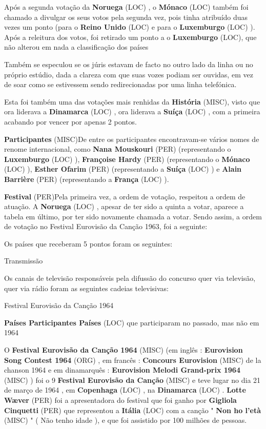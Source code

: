 \documentclass[12pt,a4paper]{article}
\begin{document}
Após a segunda votação da \textbf{Noruega} (LOC) , o \textbf{Mónaco} (LOC) também foi chamado a divulgar os seus votos pela segunda vez, pois tinha atribuído duas vezes um ponto (para o \textbf{Reino Unido} (LOC) e para o \textbf{Luxemburgo} (LOC) ). Após a releitura dos votos, foi retirado um ponto a o \textbf{Luxemburgo} (LOC), que não alterou em nada a classificação dos países

Também se especulou se os júris estavam de facto no outro lado da linha ou no próprio estúdio, dada a clareza com que suas vozes podiam ser ouvidas, em vez de soar como se estivessem sendo redirecionadas por uma linha telefónica.

Esta foi também uma das votações mais renhidas da \textbf{História} (MISC), visto que ora liderava a \textbf{Dinamarca} (LOC) , ora liderava a \textbf{Suíça} (LOC) , com a primeira acabando por vencer por apenas 2 pontos.



\textbf{Participantes} (MISC)De entre os participantes encontravam-se vários nomes de renome internacional, como \textbf{Nana Mouskouri} (PER) (representando o \textbf{Luxemburgo} (LOC) ), \textbf{Françoise Hardy} (PER) (representando o \textbf{Mónaco} (LOC) ), \textbf{Esther Ofarim} (PER) (representando a \textbf{Suíça} (LOC) ) e \textbf{Alain Barrière} (PER) (representando a \textbf{França} (LOC) ).



\textbf{Festival} (PER)Pela primeira vez, a ordem de votação, respeitou a ordem de atuação. A \textbf{Noruega} (LOC) , apesar de ter sido a quinta a votar, aparece a tabela em último, por ter sido novamente chamada a votar. Sendo assim, a ordem de votação no Festival Eurovisão da Canção 1963, foi a seguinte:

Os países que receberam 5 pontos foram os seguintes:



Transmissão

Os canais de televisão responsáveis pela difussão do concurso quer via televisão, quer via rádio foram as seguintes cadeias televisivas:



Festival Eurovisão da Canção 1964



\textbf{Países Participantes Países} (LOC) que participaram no passado, mas não em 1964

O \textbf{Festival Eurovisão da Canção 1964} (MISC) (em inglês : \textbf{Eurovision Song Contest 1964} (ORG) , em francês : \textbf{Concours Eurovision} (MISC) de la chanson 1964 e em dinamarquês : \textbf{Eurovision Melodi Grand-prix 1964} (MISC) ) foi o 9 \textbf{Festival Eurovisão da Canção} (MISC) e teve lugar no dia 21 de março de 1964 , em \textbf{Copenhaga} (LOC) , na \textbf{Dinamarca} (LOC) . \textbf{Lotte Wæver} (PER) foi a apresentadora do festival que foi ganho por \textbf{Gigliola Cinquetti} (PER) que representou a \textbf{Itália} (LOC) com a canção " \textbf{Non ho l'età} (MISC) " ( Não tenho idade ), e que foi assistido por 100 milhões de pessoas.
\end{document}
